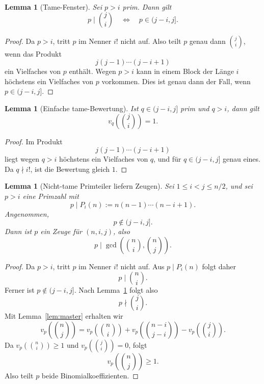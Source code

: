 \documentclass[12pt,a4paper]{article}
\theoremstyle{plain}
\newtheorem{lemma}[theorem]{Lemma}
\theoremstyle{definition}
\theoremstyle{remark}
\begin{document}
	\begin{lemma}[Tame-Fenster]
		\label{lem:tame-window}
		Sei \(p>i\) prim. Dann gilt
		\[
		p\mid \binom ji
		\quad\Longleftrightarrow\quad
		p\in(j-i,j].
		\]
	\end{lemma}
	
	\begin{proof}
		Da \(p>i\), tritt \(p\) im Nenner \(i!\) nicht auf. Also teilt \(p\) genau dann \(\binom ji\), wenn das Produkt
		\[
		j(j-1)\cdots(j-i+1)
		\]
		ein Vielfaches von \(p\) enthält. Wegen \(p>i\) kann in einem Block der Länge \(i\) höchstens ein Vielfaches von \(p\) vorkommen. Dies ist genau dann der Fall, wenn \(p\in(j-i,j]\).
	\end{proof}
	
	\begin{lemma}[Einfache tame-Bewertung]
		\label{lem:tame-valuation}
		Ist \(q\in(j-i,j]\) prim und \(q>i\), dann gilt
		\[
		v_q\!\left(\binom ji\right)=1.
		\]
	\end{lemma}
	
	\begin{proof}
		Im Produkt
		\[
		j(j-1)\cdots(j-i+1)
		\]
		liegt wegen \(q>i\) höchstens ein Vielfaches von \(q\), und für \(q\in(j-i,j]\) genau eines. Da \(q\nmid i!\), ist die Bewertung gleich \(1\).
	\end{proof}
	
	\begin{lemma}[Nicht-tame Primteiler liefern Zeugen]
		\label{lem:nontame_witness}
		Sei \(1\le i<j\le n/2\), und sei \(p>i\) eine Primzahl mit
		\[
		p\mid P_i(n):=n(n-1)\cdots(n-i+1).
		\]
		Angenommen,
		\[
		p\notin (j-i,j].
		\]
		Dann ist \(p\) ein Zeuge für \((n,i,j)\), also
		\[
		p\mid \gcd\!\left(\binom ni,\binom nj\right).
		\]
	\end{lemma}
	
	\begin{proof}
		Da \(p>i\), tritt \(p\) im Nenner \(i!\) nicht auf. Aus \(p\mid P_i(n)\) folgt daher
		\[
		p\mid \binom ni.
		\]
		Ferner ist \(p\notin(j-i,j]\). Nach Lemma~\ref{lem:tame-window} folgt also
		\[
		p\nmid \binom ji.
		\]
		Mit Lemma~\ref{lem:master} erhalten wir
		\[
		v_p\!\left(\binom nj\right)
		=
		v_p\!\left(\binom ni\right)
		+
		v_p\!\left(\binom{n-i}{j-i}\right)
		-
		v_p\!\left(\binom ji\right).
		\]
		Da \(v_p\!\left(\binom ni\right)\ge1\) und \(v_p\!\left(\binom ji\right)=0\), folgt
		\[
		v_p\!\left(\binom nj\right)\ge1.
		\]
		Also teilt \(p\) beide Binomialkoeffizienten.
	\end{proof}
	
\end{document}
